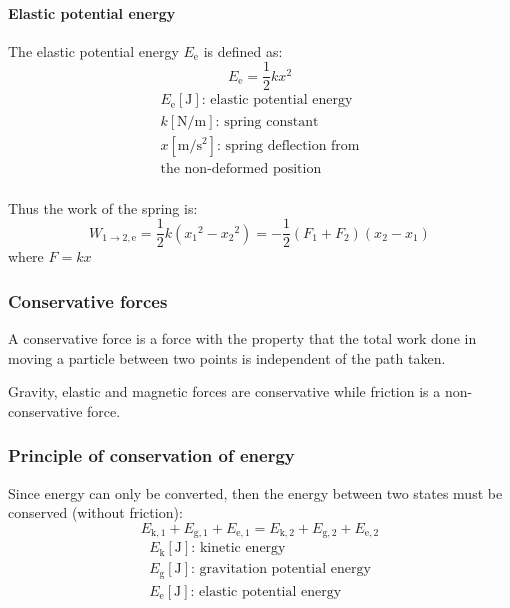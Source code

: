 \documentclass[10pt, twocolumn]{article}
\begin{document}
\paragraph{Elastic potential energy}
The elastic potential energy \(E_\mathrm{e}\) is defined as:
\[
  E_\mathrm{e} = \frac{1}{2}kx^2
\]
\[
  \begin{array}{|l}
    E_\mathrm{e} [\si{\joule}] \text{: elastic potential energy}       \\
    k [\si{\newton\per\meter}] \text{: spring constant}                \\
    x [\si{\meter\per\second\squared}] \text{: spring deflection from} \\
    \text{the non-deformed position}                                   \\
  \end{array}
\]

Thus the work of the spring is:
\[
  W_\mathrm{1 \to 2, e} = \frac{1}{2} k \left( {x_1}^2 - {x_2}^2 \right) = - \frac{1}{2} (F_1 + F_2) (x_2 - x_1)
\]
where \(F = kx\)

\subsubsection{Conservative forces}
A conservative force is a force with the property that the total work done in moving a particle between two points is independent of the path taken.

\begin{example}
  Gravity, elastic and magnetic forces are conservative while friction is a non-conservative force.
\end{example}


\subsubsection{Principle of conservation of energy}
Since energy can only be converted, then the energy between two states must be conserved (without friction):
\[
  E_\mathrm{k,1} + E_\mathrm{g,1} + E_\mathrm{e,1} = E_\mathrm{k,2} + E_\mathrm{g,2} + E_\mathrm{e,2}
\]
\[
  \begin{array}{|l}
    E_\mathrm{k} [\si{\joule}] \text{: kinetic energy}               \\
    E_\mathrm{g} [\si{\joule}] \text{: gravitation potential energy} \\
    E_\mathrm{e} [\si{\joule}] \text{: elastic potential energy}     \\
  \end{array}
\]
\end{document}
